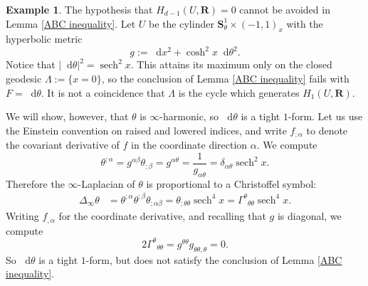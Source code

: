 \documentclass[reqno,11pt]{amsart}
\newcommand{\RR}{\mathbf{R}}
\newcommand{\Sph}{\mathbf S}
\newcommand*\dif{\mathop{}\!\mathrm{d}}
\DeclareMathOperator{\id}{id}
\DeclareMathOperator{\sech}{sech}
\theoremstyle{definition}
\newtheorem{example}[theorem]{Example}
\numberwithin{equation}{section}
\newcommand\todo[1]{\textcolor{red}{TODO: #1}}
\begin{document}
\begin{example}
The hypothesis that $H_{d - 1}(U, \RR) = 0$ cannot be avoided in Lemma \ref{ABC inequality}.
Let $U$ be the cylinder $\Sph^1_\theta \times (-1, 1)_x$ with the hyperbolic metric
$$g := \dif x^2 + \cosh^2 x \dif \theta^2.$$
Notice that $|\dif \theta|^2 = \sech^2 x$.
This attains its maximum only on the closed geodesic $\Lambda := \{x = 0\}$, so the conclusion of Lemma \ref{ABC inequality} fails with $F = \dif \theta$.
It is not a coincidence that $\Lambda$ is the cycle which generates $H_1(U, \RR)$.

We will show, however, that $\theta$ is $\infty$-harmonic, so $\dif \theta$ is a tight $1$-form.
Let us use the Einstein convention on raised and lowered indices, and write $f_{;\alpha}$ to denote the covariant derivative of $f$ in the coordinate direction $\alpha$.
We compute
$$\theta^{;\alpha} = g^{\alpha \beta} \theta_{;\beta} = g^{\alpha \theta} = \frac{1}{g_{\alpha \theta}} = \delta_{\alpha \theta} \sech^2 x.$$
Therefore the $\infty$-Laplacian of $\theta$ is proportional to a Christoffel symbol:
\begin{align*}
\Delta_\infty \theta
&= \theta^{;\alpha} \theta^{;\beta} \theta_{;\alpha \beta} 
= \theta_{;\theta \theta} \sech^4 x
= {\Gamma^\theta}_{\theta \theta} \sech^4 x.
\end{align*}
Writing $f_{,\alpha}$ for the coordinate derivative, and recalling that $g$ is diagonal, we compute
$$2 {\Gamma^\theta}_{\theta \theta} = g^{\theta \theta} g_{\theta \theta, \theta} = 0.$$
So $\dif \theta$ is a tight $1$-form, but does not satisfy the conclusion of Lemma \ref{ABC inequality}.
\end{example}



\end{document}
